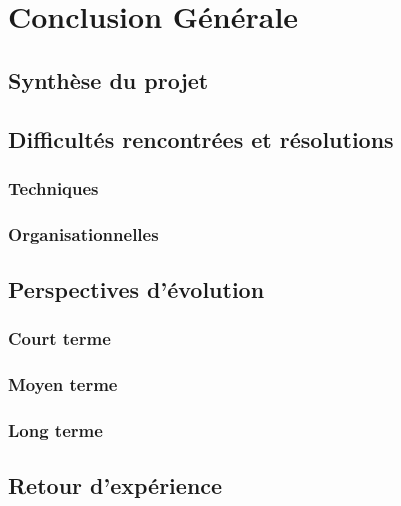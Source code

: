 \chapter*{Conclusion Générale}

\section*{Synthèse du projet}


\section*{Difficultés rencontrées et résolutions}

\subsection*{Techniques}


\subsection*{Organisationnelles}



\section*{Perspectives d’évolution}

\subsection*{Court terme}


\subsection*{Moyen terme}


\subsection*{Long terme}



\section*{Retour d’expérience}



\newpage


